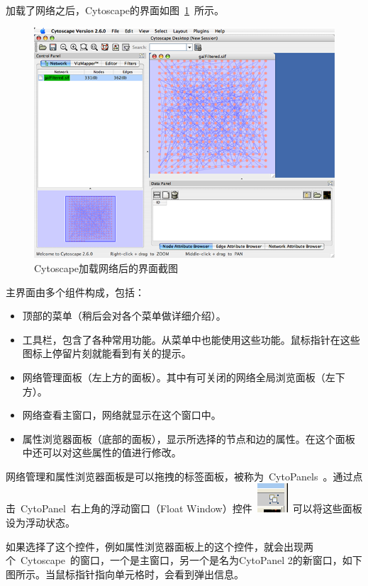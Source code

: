 加载了网络之后，Cytoscape的界面如图~\ref{fig:2.1}~所示。

\begin{figure}[!h]
\centering
\includegraphics[width=\textwidth]{images/cytoscape_startup_network_26.png}
\caption{Cytoscape加载网络后的界面截图}
\label{fig:2.1}
\end{figure}

主界面由多个组件构成，包括：
\begin{itemize}
\item 顶部的菜单（稍后会对各个菜单做详细介绍）。
\item 工具栏，包含了各种常用功能。从菜单中也能使用这些功能。鼠标指针在这些图标上停留片刻就能看到有关的提示。
\item 网络管理面板（左上方的面板）。其中有可关闭的网络全局浏览面板（左下方）。
\item 网络查看主窗口，网络就显示在这个窗口中。
\item 属性浏览器面板（底部的面板），显示所选择的节点和边的属性。在这个面板中还可以对这些属性的值进行修改。
\end{itemize}

网络管理和属性浏览器面板是可以拖拽的标签面板，被称为~CytoPanels~。通过点击~CytoPanel~右上角的浮动窗口（Float Window）控件~\includegraphics{images/float_icon.png}~可以将这些面板设为浮动状态。

如果选择了这个控件，例如属性浏览器面板上的这个控件，就会出现两个~Cytoscape~的窗口，一个是主窗口，另一个是名为CytoPanel 2的新窗口，如下图所示。当鼠标指针指向单元格时，会看到弹出信息。

